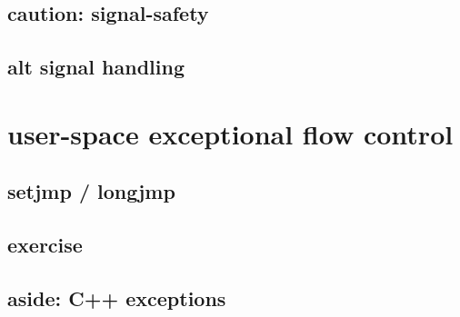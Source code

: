 \subsection{caution: signal-safety}



\subsection{alt signal handling}



\section{user-space exceptional flow control}
\subsection{setjmp / longjmp}



\subsection{exercise}


\subsection{aside: C++ exceptions}



